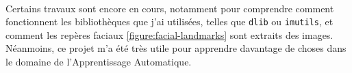 \paragraph{}
Certains travaux sont encore en cours, notamment pour comprendre comment fonctionnent les bibliothèques que j'ai utilisées, telles que \lstinline{dlib} ou \lstinline{imutils}, et comment les repères faciaux \ref{figure:facial-landmarks} sont extraits des images.
Néanmoins, ce projet m'a été très utile pour apprendre davantage de choses dans le domaine de l'Apprentissage Automatique.
